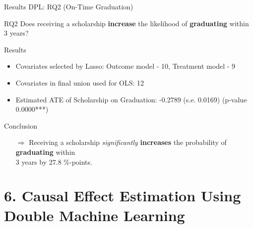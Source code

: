 \documentclass[aspectratio=169]{beamer}
\begin{document}
\begin{frame}{Results DPL: RQ2 (On-Time Graduation)}
\vspace{20pt}
\begin{alertblock}{RQ2}
	Does receiving a scholarship \textbf{increase} the likelihood of \textbf{graduating} within 3 years?
\end{alertblock}

\begin{block}{Results}
\begin{itemize}[label=--,itemsep=1pt,topsep=2pt]
	\item Covariates selected by Lasso: Outcome model - 10, Treatment model - 9
	\item Covariates in final union used for OLS: 12
	\item Estimated ATE of Scholarship on Graduation: -0.2789 (s.e. 0.0169) (p-value 0.0000***)
\end{itemize}
\end{block}

\begin{exampleblock}{Conclusion}
\vspace{-3pt}
\begin{itemize}
	\item [$\Rightarrow$]Receiving a scholarship \textit{significantly} \textbf{increases} the probability of \textbf{graduating} within \\ 3 years by 27.8 \%-points.
\end{itemize}
\vspace{-3pt}	
\end{exampleblock}

\end{frame}

\section{6. Causal Effect Estimation Using Double Machine Learning}
\end{document}
